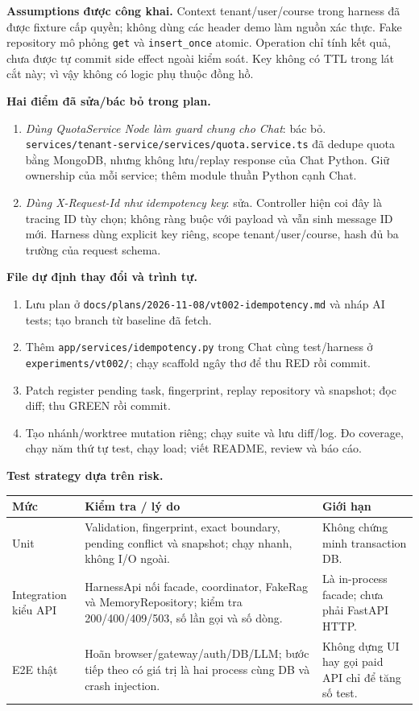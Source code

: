 \documentclass[11pt,a4paper]{article}
\DeclareRobustCommand{\code}[1]{\nolinkurl{#1}}
\begin{document}
\textbf{Assumptions được công khai.} Context tenant/user/course trong harness đã được fixture cấp quyền; không dùng các header demo làm nguồn xác thực. Fake repository mô phỏng \code{get} và \code{insert_once} atomic. Operation chỉ tính kết quả, chưa được tự commit side effect ngoài kiểm soát. Key không có TTL trong lát cắt này; vì vậy không có logic phụ thuộc đồng hồ.

\textbf{Hai điểm đã sửa/bác bỏ trong plan.}
\begin{enumerate}
\item \emph{Dùng QuotaService Node làm guard chung cho Chat}: bác bỏ. \code{services/tenant-service/services/quota.service.ts} đã dedupe quota bằng MongoDB, nhưng không lưu/replay response của Chat Python. Giữ ownership của mỗi service; thêm module thuần Python cạnh Chat.
\item \emph{Dùng X-Request-Id như idempotency key}: sửa. Controller hiện coi đây là tracing ID tùy chọn; không ràng buộc với payload và vẫn sinh message ID mới. Harness dùng explicit key riêng, scope tenant/user/course, hash đủ ba trường của request schema.
\end{enumerate}

\textbf{File dự định thay đổi và trình tự.}
\begin{enumerate}
\item Lưu plan ở \code{docs/plans/2026-11-08/vt002-idempotency.md} và nháp AI tests; tạo branch từ baseline đã fetch.
\item Thêm \code{app/services/idempotency.py} trong Chat cùng test/harness ở \code{experiments/vt002/}; chạy scaffold ngây thơ để thu RED rồi commit.
\item Patch register pending task, fingerprint, replay repository và snapshot; đọc diff; thu GREEN rồi commit.
\item Tạo nhánh/worktree mutation riêng; chạy suite và lưu diff/log. Đo coverage, chạy năm thứ tự test, chạy load; viết README, review và báo cáo.
\end{enumerate}

\textbf{Test strategy dựa trên risk.}
\begin{tabular}{@{}L{24mm}L{67mm}L{\dimexpr\textwidth-91mm-4\tabcolsep\relax}@{}}
\toprule
\textbf{Mức} & \textbf{Kiểm tra / lý do} & \textbf{Giới hạn}\\\midrule
Unit & Validation, fingerprint, exact boundary, pending conflict và snapshot; chạy nhanh, không I/O ngoài. & Không chứng minh transaction DB.\\[3pt]
Integration kiểu API & HarnessApi nối facade, coordinator, FakeRag và MemoryRepository; kiểm tra 200/400/409/503, số lần gọi và số dòng. & Là in-process facade; chưa phải FastAPI HTTP.\\[3pt]
E2E thật & Hoãn browser/gateway/auth/DB/LLM; bước tiếp theo có giá trị là hai process cùng DB và crash injection. & Không dựng UI hay gọi paid API chỉ để tăng số test.\\
\bottomrule
\end{tabular}
\end{document}
